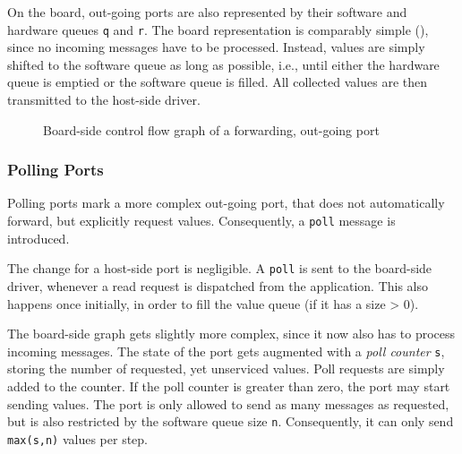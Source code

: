 \documentclass{report}
\begin{document}
On the board, out-going ports are also represented by their software and hardware queues \texttt{q} and \texttt{r}. The board representation is comparably simple (), since no incoming messages have to be processed. Instead, values are simply shifted to the software queue as long as possible, i.e., until either the hardware queue is emptied or the software queue is filled. All collected values are then transmitted to the host-side driver.

\begin{figure}[h]
\centering
{}
\label{fig:cfg:boardOut}
\caption{Board-side control flow graph of a forwarding, out-going port}
\end{figure}

\subsubsection{Polling Ports}
Polling ports mark a more complex out-going port, that does not automatically forward, but explicitly request values. Consequently, a \texttt{poll} message is introduced.

The change for a host-side port is negligible. A \texttt{poll} is sent to the board-side driver, whenever a read request is dispatched from the application. This also happens once initially, in order to fill the value queue (if it has a size > 0).

The board-side graph gets slightly more complex, since it now also has to process incoming messages. The state of the port gets augmented with a \textit{poll counter} \texttt{s}, storing the number of requested, yet unserviced values. Poll requests are simply added to the counter. If the poll counter is greater than zero, the port may start sending values. The port is only allowed to send as many messages as requested, but is also restricted by the software queue size \texttt{n}. Consequently, it can only send \texttt{max(s,n)} values per step.
\end{document}
